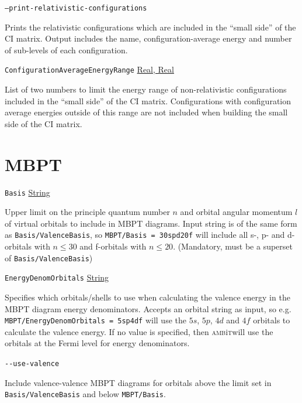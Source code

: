\documentclass{report}
\newcommand{\ambit}{\textsc{amb}{\footnotesize i}\textsc{t}}
\begin{document}
\texttt{--print-relativistic-configurations}
\begin{adjustwidth}{1cm}{}
Prints the relativistic configurations which are included in the ``small side'' of the CI matrix.
Output includes the name, configuration-average energy and number of sub-levels of each configuration.
\end{adjustwidth}

\texttt{ConfigurationAverageEnergyRange} \uline{Real, Real}
\begin{adjustwidth}{1cm}{}
List of two numbers to limit the energy range of non-relativistic configurations included in the ``small
side'' of the CI matrix.
Configurations with configuration average energies outside of this range are not included when building
the small side of the CI matrix.
\end{adjustwidth}

\section{MBPT}

\texttt{Basis} \uline{String}
\begin{adjustwidth}{1cm}{}
Upper limit on the principle quantum number $n$ and orbital angular momentum $l$ of
virtual orbitals to include in MBPT diagrams. Input string is of the same form as
\texttt{Basis/ValenceBasis}, so \texttt{MBPT/Basis = 30spd20f} will include all s-, p- and d-orbitals
with $n \leq 30$ and f-orbitals with $n \leq 20$. (Mandatory, must be a superset of
\texttt{Basis/ValenceBasis})
\end{adjustwidth}

\texttt{EnergyDenomOrbitals} \uline{String}
\begin{adjustwidth}{1cm}{}
Specifies which orbitals/shells to use when calculating the valence energy
in the MBPT diagram energy denominators. Accepts an orbital string as input, so e.g. 
\texttt{MBPT/EnergyDenomOrbitals = 5sp4df} will use the $5s$, $5p$, $4d$ and $4f$ orbitals to calculate
the valence energy. If no value is specified, then \ambit will use the orbitals at the Fermi level for
energy denominators.
\end{adjustwidth}

\texttt{{-}{-}use-valence}
\begin{adjustwidth}{1cm}{}
Include valence-valence MBPT diagrams for orbitals above the limit set in \texttt{Basis/ValenceBasis} 
and below \texttt{MBPT/Basis}.
\end{adjustwidth}
\end{document}
